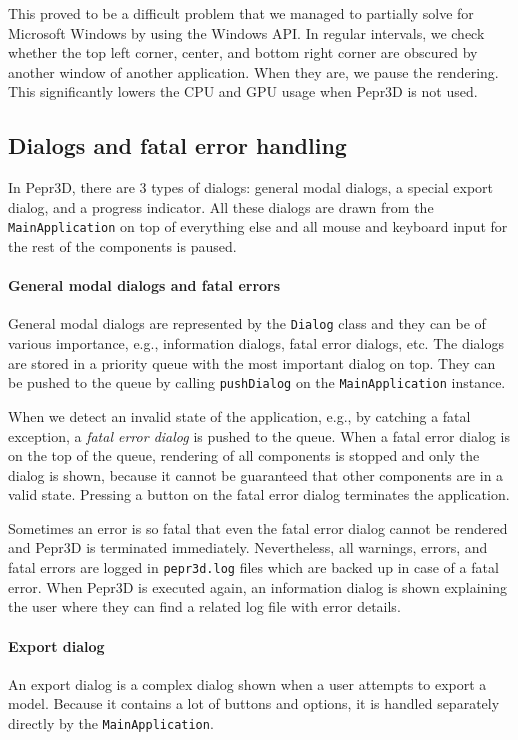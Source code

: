 This proved to be a difficult problem that we managed to partially solve for Microsoft Windows by using the Windows API.
In regular intervals, we check whether the top left corner, center, and bottom right corner are obscured by another window of another application.
When they are, we pause the rendering.
This significantly lowers the CPU and GPU usage when Pepr3D is not used.

\subsection{Dialogs and fatal error handling}

In Pepr3D, there are 3 types of dialogs: general modal dialogs, a special export dialog, and a progress indicator.
All these dialogs are drawn from the \texttt{MainApplication} on top of everything else and all mouse and keyboard input for the rest of the components is paused.

\paragraph{General modal dialogs and fatal errors}
General modal dialogs are represented by the \texttt{Dialog} class and they can be of various importance, e.g., information dialogs, fatal error dialogs, etc.
The dialogs are stored in a priority queue with the most important dialog on top.
They can be pushed to the queue by calling \texttt{pushDialog} on the \texttt{MainApplication} instance.

When we detect an invalid state of the application, e.g., by catching a fatal exception, a \emph{fatal error dialog} is pushed to the queue.
When a fatal error dialog is on the top of the queue, rendering of all components is stopped and only the dialog is shown, because it cannot be guaranteed that other components are in a valid state.
Pressing a button on the fatal error dialog terminates the application.

Sometimes an error is so fatal that even the fatal error dialog cannot be rendered and Pepr3D is terminated immediately.
Nevertheless, all warnings, errors, and fatal errors are logged in \texttt{pepr3d.log} files which are backed up in case of a fatal error.
When Pepr3D is executed again, an information dialog is shown explaining the user where they can find a related log file with error details.

\paragraph{Export dialog}
An export dialog is a complex dialog shown when a user attempts to export a model.
Because it contains a lot of buttons and options, it is handled separately directly by the \texttt{MainApplication}.

